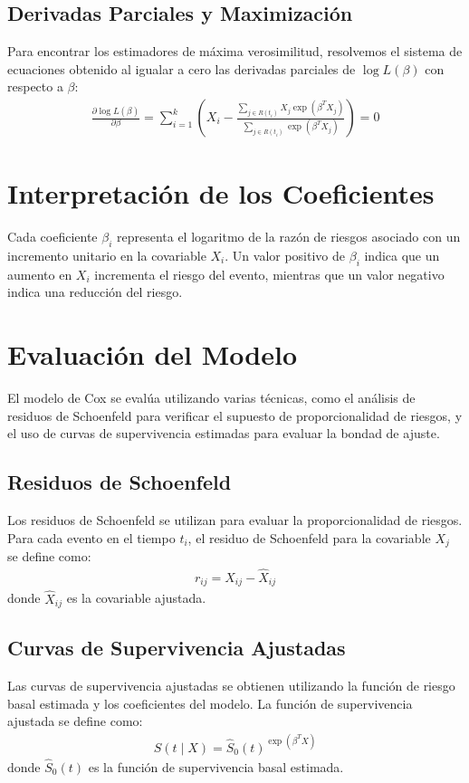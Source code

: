 \documentclass[a4paper]{report} %
\begin{document}
\subsection{Derivadas Parciales y Maximizaci\'on}
Para encontrar los estimadores de m\'axima verosimilitud, resolvemos el sistema de ecuaciones obtenido al igualar a cero las derivadas parciales de $\log L(\beta)$ con respecto a $\beta$:
\begin{eqnarray*}
\frac{\partial \log L(\beta)}{\partial \beta} = \sum_{i=1}^k \left(X_i - \frac{\sum_{j \in R(t_i)} X_j \exp(\beta^T X_j)}{\sum_{j \in R(t_i)} \exp(\beta^T X_j)}\right) = 0
\end{eqnarray*}

\section{Interpretaci\'on de los Coeficientes}
Cada coeficiente $\beta_i$ representa el logaritmo de la raz\'on de riesgos asociado con un incremento unitario en la covariable $X_i$. Un valor positivo de $\beta_i$ indica que un aumento en $X_i$ incrementa el riesgo del evento, mientras que un valor negativo indica una reducci\'on del riesgo.

\section{Evaluaci\'on del Modelo}
El modelo de Cox se eval\'ua utilizando varias t\'ecnicas, como el an\'alisis de residuos de Schoenfeld para verificar el supuesto de proporcionalidad de riesgos, y el uso de curvas de supervivencia estimadas para evaluar la bondad de ajuste.

\subsection{Residuos de Schoenfeld}
Los residuos de Schoenfeld se utilizan para evaluar la proporcionalidad de riesgos. Para cada evento en el tiempo $t_i$, el residuo de Schoenfeld para la covariable $X_j$ se define como:
\begin{eqnarray*}
r_{ij} = X_{ij} - \hat{X}_{ij}
\end{eqnarray*}
donde $\hat{X}_{ij}$ es la covariable ajustada.

\subsection{Curvas de Supervivencia Ajustadas}
Las curvas de supervivencia ajustadas se obtienen utilizando la funci\'on de riesgo basal estimada y los coeficientes del modelo. La funci\'on de supervivencia ajustada se define como:
\begin{eqnarray*}
\hat{S}(t \mid X) = \hat{S}_0(t)^{\exp(\beta^T X)}
\end{eqnarray*}
donde $\hat{S}_0(t)$ es la funci\'on de supervivencia basal estimada.
\end{document}
